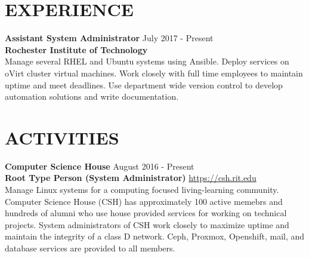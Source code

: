 \documentclass[line, margin, 11pt]{res}
\begin{document}
\begin{resume}
\section{EXPERIENCE}
{\bf \large{Assistant System Administrator}} \hfill July 2017 - Present \\
{\bf Rochester Institute of Technology} \\
Manage several RHEL and Ubuntu systems using Ansible.  Deploy services on oVirt cluster virtual machines.  Work closely with full
time employees to maintain uptime and meet deadlines.  Use department wide version control to develop automation solutions and write documentation.

\section{ACTIVITIES}
{\bf \large{Computer Science House}} \hfill August 2016 - Present \\
{\bf Root Type Person (System Administrator)} \hfill \url{https://csh.rit.edu} \\
Manage Linux systems for a computing focused living-learning community.
Computer Science House (CSH) has approximately 100 active memebrs and hundreds of alumni
who use house provided services for working on technical projects.  System administrators of CSH
work closely to maximize uptime and maintain the integrity of a class D network.  Ceph, Proxmox,
Openshift, mail, and database services are provided to all members.

\end{resume}
\end{document}
